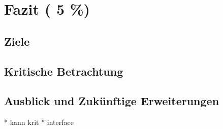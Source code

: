 \chapter{Fazit ( 5 \%)}
\section{Ziele}


\section{Kritische Betrachtung}





\section{Ausblick und Zukünftige Erweiterungen}

* kann krit
* interface
